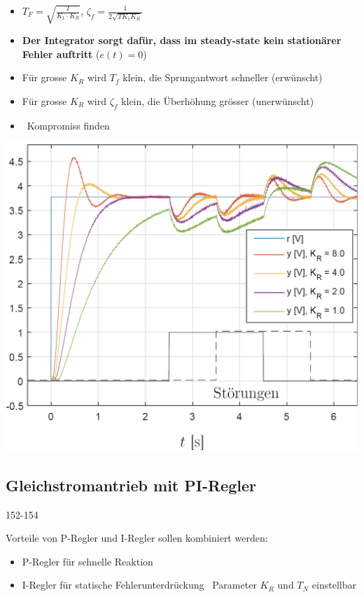 \begin{minipage}[c]{0.48\columnwidth}
    \begin{itemize}
        \item $T_F = \sqrt{ \frac{T}{K_1 \cdot K_R} }$, $\zeta_f = \frac{1}{2 \sqrt{T K_1 K_R}}$
        \item \textbf{Der Integrator sorgt dafür, dass im steady-state kein stationärer Fehler auftritt} ($e(t) = 0$)
        \item Für grosse $K_R$ wird $T_f$ klein, die Sprungantwort schneller (erwünscht)
        \item Für grosse $K_R$ wird $\zeta_f$ klein, die Überhöhung grösser (unerwünscht)
        \item \textrightarrow\ Kompromiss finden
    \end{itemize}
\end{minipage}
\hfill
\begin{minipage}[c]{0.48\columnwidth}
    \includegraphics[width=\columnwidth]{images/gleichstromantrieb_i-regler_step_response.png}
\end{minipage}


\subsection{Gleichstromantrieb mit PI-Regler}{152-154}

Vorteile von P-Regler und I-Regler sollen kombiniert werden:
\begin{itemize}
    \item P-Regler für schnelle Reaktion
    \item I-Regler für statische Fehlerunterdrückung
        \textrightarrow\ Parameter $K_R$ und $T_N$ einstellbar
\end{itemize}

